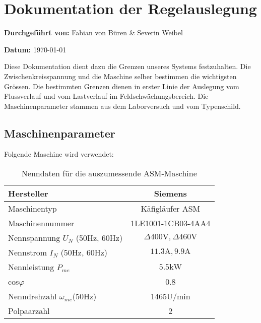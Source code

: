 \clearpage
\section{Dokumentation der Regelauslegung}\label{sec: Regelauslegung}
\vspace{0.5cm}
\textbf{Durchgeführt von:} Fabian von Büren \& Severin Weibel

\textbf{Datum:} \today
\vspace{1cm}

Diese Dokumentation dient dazu die Grenzen unseres Systems festzuhalten. Die Zwischenkreisspannung und die Maschine selber bestimmen die wichtigsten Grössen. Die bestimmten Grenzen dienen in erster Linie der Auslegung vom Flussverlauf und vom Lastverlauf im Feldschwächungsbereich. Die Maschinenparameter stammen aus dem Laborversuch und vom Typenschild. 


\subsection{Maschinenparameter}
Folgende Maschine wird verwendet:

\renewcommand{\arraystretch}{1.5}
\begin{table}[h]
	\centering
	\begin{tabular}{|l|c|}
		\hline
		Hersteller & Siemens \\ \hline
		Maschinentyp & Käfigläufer ASM \\ \hline
		Maschinennummer & 1LE1001-1CB03-4AA4 \\ \hline
		Nennspannung $U_{N}$ (50Hz, 60Hz) & $\Delta 400\mathrm{V}, \Delta 460\mathrm{V}$ \\ \hline
		Nennstrom $I_{N}$ (50Hz, 60Hz) & $11.3\mathrm{A}, 9.9\mathrm{A}$ \\ \hline 
		Nennleistung $P_{me}$ & $5.5\mathrm{kW}$ \\ \hline 
		cos$\varphi$ & 0.8 \\ \hline
		Nenndrehzahl $\omega_{me}$(50Hz) & 1465U/min \\ \hline
		Polpaarzahl & 2 \\ \hline
	\end{tabular} 	
	\caption{Nenndaten für die auszumessende ASM-Maschine}
	\label{tab:Nenndaten_ASM}
\end{table}

